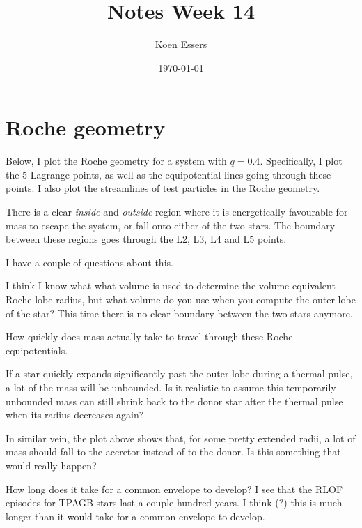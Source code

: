 \documentclass[a4paper,10pt]{article}
\title{Notes Week 14}
\author{Koen Essers}
\date{\today}
\begin{document}
\setuplayout
\section{Roche geometry}

Below, I plot the Roche geometry for a system with \(q=0.4\). Specifically, I plot the 5 Lagrange points, as well as the equipotential lines going through these points. I also plot the streamlines of test particles in the Roche geometry. 

\begin{figure}[ht]
    \centering
\end{figure}
There is a clear \emph{inside} and \emph{outside} region where it is energetically favourable for mass to escape the system, or fall onto either of the two stars. The boundary between these regions goes through the L2, L3, L4 and L5 points.

I have a couple of questions about this.
\begin{enumd}
    \item  I think I know what what volume is used to determine the volume equivalent Roche lobe radius, but what volume do you use when you compute the outer lobe of the star? This time there is no clear boundary between the two stars anymore.
    \item How quickly does mass actually take to travel through these Roche equipotentials.
    \item If a star quickly expands significantly past the outer lobe during a thermal pulse, a lot of the mass will be unbounded. Is it realistic to assume this temporarily unbounded mass can still shrink back to the donor star after the thermal pulse when its radius decreases again?
    \item In similar vein, the plot above shows that, for some pretty extended radii, a lot of mass should fall to the accretor instead of to the donor. Is this something that would really happen? 
    \item How long does it take for a common envelope to develop? I see that the RLOF episodes for TPAGB stars last a couple hundred years. I think (?) this is much longer than it would take for a common envelope to develop.
\end{enumd}
\end{document}

